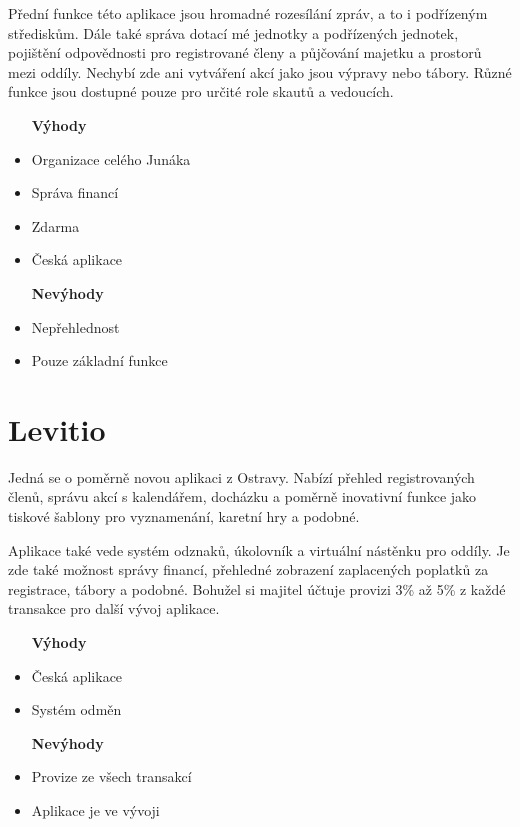 \documentclass[twoside]{ctuthesis}
\begin{document}
Přední funkce této aplikace jsou hromadné rozesílání zpráv, a to i podřízeným střediskům. Dále také správa dotací mé jednotky a podřízených jednotek, pojištění odpovědnosti pro registrované členy a půjčování majetku a prostorů mezi oddíly. Nechybí zde ani vytváření akcí jako jsou výpravy nebo tábory.
Různé funkce jsou dostupné pouze pro určité role skautů a vedoucích. \\


\begin{itemize}
\setlength{\itemindent}{0.7cm}
    \item [\textbf{Výhody}]
    \item Organizace celého Junáka
    \item Správa financí
    \item Zdarma
    \item Česká aplikace
\end{itemize}


\begin{itemize}
\setlength{\itemindent}{1.1cm}
    \item [\textbf{Nevýhody}]
    \setlength{\itemindent}{0.7cm}
    \item Nepřehlednost
    \item Pouze základní funkce
\end{itemize}


\section{Levitio}
Jedná se o poměrně novou aplikaci z Ostravy. Nabízí přehled registrovaných členů, správu akcí s kalendářem, docházku a poměrně inovativní funkce jako tiskové šablony pro vyznamenání, karetní hry a podobné.

Aplikace také vede systém odznaků, úkolovník a virtuální nástěnku pro oddíly.
Je zde také možnost správy financí, přehledné zobrazení zaplacených poplatků za registrace, tábory a podobné. Bohužel si majitel účtuje provizi 3\% až 5\% z každé transakce pro další vývoj aplikace.

\begin{itemize}
\setlength{\itemindent}{0.7cm}
    \item [\textbf{Výhody}]
    \item Česká aplikace
    \item Systém odměn

\end{itemize}
\begin{itemize}
\setlength{\itemindent}{1.1cm}
    \item [\textbf{Nevýhody}]
    \setlength{\itemindent}{0.7cm}
    \item Provize ze všech transakcí
    \item Aplikace je ve vývoji
\end{itemize}
\end{document}

